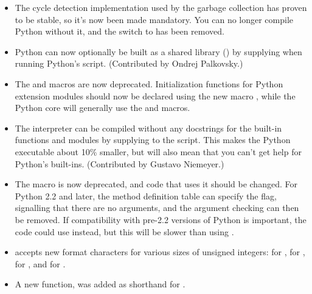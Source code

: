 \documentclass{howto}
\begin{document}
\begin{itemize}

\item The cycle detection implementation used by the garbage collection
has proven to be stable, so it's now been made mandatory.  You can no
longer compile Python without it, and the
 switch to  has been removed.

\item Python can now optionally be built as a shared library
() by supplying 
when running Python's  script.  (Contributed by Ondrej
Palkovsky.)

\item The  and  macros
are now deprecated.  Initialization functions for Python extension
modules should now be declared using the new macro
, while the Python core will generally
use the  and 
macros.

\item The interpreter can be compiled without any docstrings for
the built-in functions and modules by supplying
 to the  script.
This makes the Python executable about 10\% smaller, but will also
mean that you can't get help for Python's built-ins.  (Contributed by
Gustavo Niemeyer.)

\item The  macro is now deprecated, and code
that uses it should be changed.  For Python 2.2 and later, the method
definition table can specify the
 flag, signalling that there are no arguments, and
the argument checking can then be removed.  If compatibility with
pre-2.2 versions of Python is important, the code could use
 instead, but this will be slower
than using .

\item {} accepts new format characters for various sizes of unsigned integers:  for ,
 for , 
 for , 
and  for .

\item A new function,  was added as shorthand for
.


\end{itemize}
\end{document}
